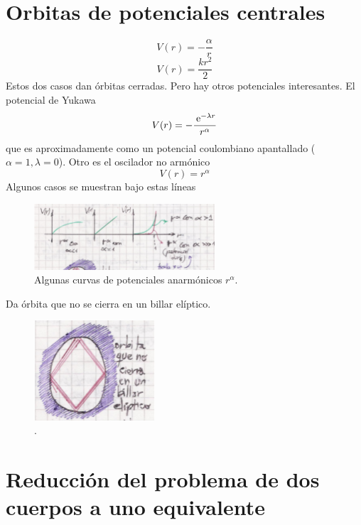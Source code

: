 \documentclass[10pt,oneside]{CBFT_book}
\begin{document}
\section{Orbitas de potenciales centrales}

\[
	V(r) = -\frac{\alpha}{r}
\]
\[
	V(r) = \frac{ k r^2 }{2}
\]
Estos dos casos dan órbitas cerradas. Pero hay otros potenciales interesantes.
El potencial de Yukawa
\[
	V(r) = - \frac{\:\mathrm{e}^{-\lambda r}}{r^\alpha}
\]
que es aproximadamente como un potencial coulombiano apantallado ($\alpha=1,\lambda=0$).
Otro es el oscilador no armónico
\[
	V(r) = r^\alpha
\]
Algunos casos se muestran bajo estas líneas

\begin{figure}[hbt]
	\begin{center}
	\includegraphics[width=0.6\textwidth]{images/fig_mc_potenciales_otro.pdf}
	\end{center}
	\caption{Algunas curvas de potenciales anarmónicos $ r^\alpha $.}
\end{figure}

Da órbita que no se cierra en un billar elíptico.

\begin{figure}[hbt]
	\begin{center}
	\includegraphics[width=0.4\textwidth]{images/fig_mc_billar.pdf}
	\end{center}
	\caption{.}
\end{figure}

\section{Reducción del problema de dos cuerpos a uno equivalente}
\end{document}
